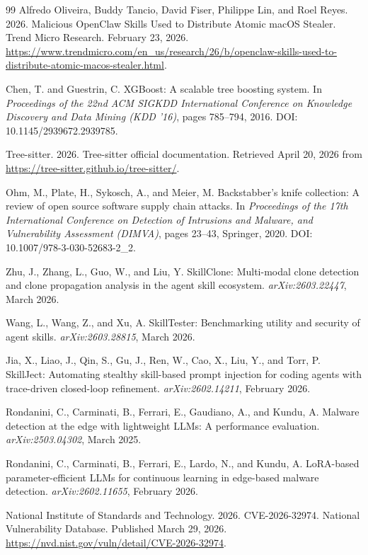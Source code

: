 \documentclass[sigconf,nonacm]{acmart}
\begin{document}
\begin{thebibliography}{99}
Alfredo Oliveira, Buddy Tancio, David Fiser, Philippe Lin, and Roel Reyes. 2026. Malicious OpenClaw Skills Used to Distribute Atomic macOS Stealer. Trend Micro Research. February 23, 2026. \url{https://www.trendmicro.com/en_us/research/26/b/openclaw-skills-used-to-distribute-atomic-macos-stealer.html}.

Chen, T. and Guestrin, C. XGBoost: A scalable tree boosting system. In \textit{Proceedings of the 22nd ACM SIGKDD International Conference on Knowledge Discovery and Data Mining (KDD '16)}, pages 785--794, 2016. DOI: 10.1145/2939672.2939785.

Tree-sitter. 2026. Tree-sitter official documentation. Retrieved April 20, 2026 from \url{https://tree-sitter.github.io/tree-sitter/}.

Ohm, M., Plate, H., Sykosch, A., and Meier, M. Backstabber's knife collection: A review of open source software supply chain attacks. In \textit{Proceedings of the 17th International Conference on Detection of Intrusions and Malware, and Vulnerability Assessment (DIMVA)}, pages 23--43, Springer, 2020. DOI: 10.1007/978-3-030-52683-2\_2.

Zhu, J., Zhang, L., Guo, W., and Liu, Y. SkillClone: Multi-modal clone detection and clone propagation analysis in the agent skill ecosystem. \textit{arXiv:2603.22447}, March 2026.

Wang, L., Wang, Z., and Xu, A. SkillTester: Benchmarking utility and security of agent skills. \textit{arXiv:2603.28815}, March 2026.

Jia, X., Liao, J., Qin, S., Gu, J., Ren, W., Cao, X., Liu, Y., and Torr, P. SkillJect: Automating stealthy skill-based prompt injection for coding agents with trace-driven closed-loop refinement. \textit{arXiv:2602.14211}, February 2026.

Rondanini, C., Carminati, B., Ferrari, E., Gaudiano, A., and Kundu, A. Malware detection at the edge with lightweight LLMs: A performance evaluation. \textit{arXiv:2503.04302}, March 2025.

Rondanini, C., Carminati, B., Ferrari, E., Lardo, N., and Kundu, A. LoRA-based parameter-efficient LLMs for continuous learning in edge-based malware detection. \textit{arXiv:2602.11655}, February 2026.

National Institute of Standards and Technology. 2026. CVE-2026-32974. National Vulnerability Database. Published March 29, 2026. \url{https://nvd.nist.gov/vuln/detail/CVE-2026-32974}.


\end{thebibliography}
\end{document}
